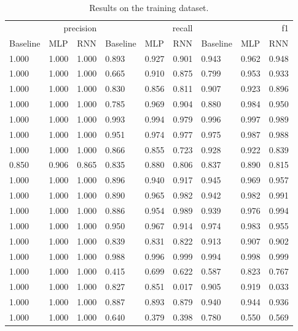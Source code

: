 \begin{table}
\caption{Results on the training dataset.}
\label{tab::ex_2_train}
\begin{tabular}{|l||l||l||l||l||l||l||l||l|}
\toprule
\multicolumn{3}{r}{precision} & \multicolumn{3}{r}{recall} & \multicolumn{3}{r}{f1} \\
Baseline & MLP & RNN & Baseline & MLP & RNN & Baseline & MLP & RNN \\
\midrule
1.000 & 1.000 & 1.000 & 0.893 & 0.927 & 0.901 & 0.943 & 0.962 & 0.948 \\
1.000 & 1.000 & 1.000 & 0.665 & 0.910 & 0.875 & 0.799 & 0.953 & 0.933 \\
1.000 & 1.000 & 1.000 & 0.830 & 0.856 & 0.811 & 0.907 & 0.923 & 0.896 \\
1.000 & 1.000 & 1.000 & 0.785 & 0.969 & 0.904 & 0.880 & 0.984 & 0.950 \\
1.000 & 1.000 & 1.000 & 0.993 & 0.994 & 0.979 & 0.996 & 0.997 & 0.989 \\
1.000 & 1.000 & 1.000 & 0.951 & 0.974 & 0.977 & 0.975 & 0.987 & 0.988 \\
1.000 & 1.000 & 1.000 & 0.866 & 0.855 & 0.723 & 0.928 & 0.922 & 0.839 \\
0.850 & 0.906 & 0.865 & 0.835 & 0.880 & 0.806 & 0.837 & 0.890 & 0.815 \\
1.000 & 1.000 & 1.000 & 0.896 & 0.940 & 0.917 & 0.945 & 0.969 & 0.957 \\
1.000 & 1.000 & 1.000 & 0.890 & 0.965 & 0.982 & 0.942 & 0.982 & 0.991 \\
1.000 & 1.000 & 1.000 & 0.886 & 0.954 & 0.989 & 0.939 & 0.976 & 0.994 \\
1.000 & 1.000 & 1.000 & 0.950 & 0.967 & 0.914 & 0.974 & 0.983 & 0.955 \\
1.000 & 1.000 & 1.000 & 0.839 & 0.831 & 0.822 & 0.913 & 0.907 & 0.902 \\
1.000 & 1.000 & 1.000 & 0.988 & 0.996 & 0.999 & 0.994 & 0.998 & 0.999 \\
1.000 & 1.000 & 1.000 & 0.415 & 0.699 & 0.622 & 0.587 & 0.823 & 0.767 \\
1.000 & 1.000 & 1.000 & 0.827 & 0.851 & 0.017 & 0.905 & 0.919 & 0.033 \\
1.000 & 1.000 & 1.000 & 0.887 & 0.893 & 0.879 & 0.940 & 0.944 & 0.936 \\
1.000 & 1.000 & 1.000 & 0.640 & 0.379 & 0.398 & 0.780 & 0.550 & 0.569 \\
\bottomrule
\end{tabular}
\end{table}
